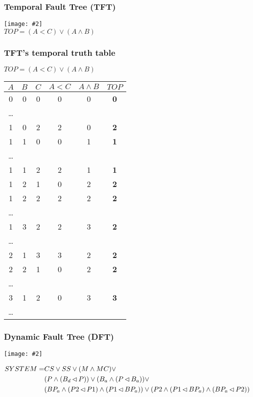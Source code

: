 \documentclass{beamer}
\def\TFT{%
	Temporal Fault Tree (TFT)%
	\gdef\TFT{TFT\xspace}%
	\gdef\TFTs{TFTs\xspace}%
	\xspace%
}
\def\TFTs{%
	Temporal Fault Trees (TFTs)%
	\gdef\TFT{TFT\xspace}%
	\gdef\TFTs{TFTs\xspace}%
	\xspace%
}
\def\DFT{%
	Dynamic Fault Tree (DFT)%
	\gdef\DFT{DFT\xspace}%
	\gdef\DFTs{DFTs\xspace}%
	\xspace%
}
\def\DFTs{%
	Dynamic Fault Trees (DFTs)%
	\gdef\DFT{DFT\xspace}%
	\gdef\DFTs{DFTs\xspace}%
	\xspace%
}
\newcommand{\includegraphicsaspectratio}[2][1]{%
  \texttt{[image: \#2]}%
}
\def\nibefore{\ensuremath\operatorname{\lhd}}
\begin{document}
\begin{frame}
	\frametitle{\TFT}
	\begin{center}
		\includegraphicsaspectratio[0.55]{tft-small-example}\\
		$TOP = (A < C) \lor (A \land B)$
	\end{center}
\end{frame}

\begin{frame}
	\frametitle{\TFT's temporal truth table}
	\begin{center}
	\scriptsize
		$TOP = (A < C) \lor (A \land B)$\\
		\begin{tabular}{cccccc}
			$A$ & $B$ & $C$ & $A < C$ & $A \land B$ & $TOP$\\
			\hline
			0 & 0 & 0 & 0 & 0 & \textbf{0}\\
			\ldots\\
			1 & 0 & 2 & 2 & 0 & \textbf{2}\\
			1 & 1 & 0 & 0 & 1 & \textbf{1}\\
			\ldots\\
			1 & 1 & 2 & 2 & 1 & \textbf{1}\\
			1 & 2 & 1 & 0 & 2 & \textbf{2}\\
			1 & 2 & 2 & 2 & 2 & \textbf{2}\\
			\ldots\\
			1 & 3 & 2 & 2 & 3 & \textbf{2}\\
			\ldots\\
			2 & 1 & 3 & 3 & 2 & \textbf{2}\\
			2 & 2 & 1 & 0 & 2 & \textbf{2}\\
			\ldots\\
			3 & 1 & 2 & 0 & 3 & \textbf{3}\\
			\ldots\\
			\hline
		\end{tabular}
	\end{center}
\end{frame}

\begin{frame}[fragile]
	\frametitle{\DFT}
	\begin{center}
		\scriptsize
		\includegraphicsaspectratio[0.60]{dft-example-mrl2014}
		\begin{align*}
		SYSTEM =& CS \lor SS \lor (M \land MC) \lor \\
			&(P \land (B_d \nibefore P)) \lor (B_a \land (P \nibefore B_a)) \lor \\
			&(BP_a \land (P2 \nibefore P1) \land (P1 \nibefore BP_a)) \lor
			(P2 \land (P1 \nibefore BP_a) \land (BP_a \nibefore P2))
		\end{align*}
	\end{center}
\end{frame}
\end{document}
